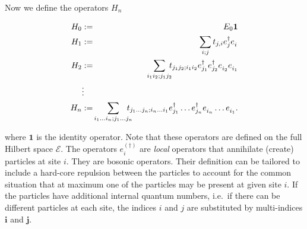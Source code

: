 Now we define the operators $H_n$
\begin{mathletters}
\label{class}
\begin{eqnarray}
  H_0&:=& E_0{\mathbf 1}\\
  H_1&:=& \sum_{i;j}t_{j,i}e_{j}^{\dagger}e_{i}^
  {\phantom{\dagger}}\\
  H_2&:=& \sum_{i_1i_2;j_1j_2}\!\!\!t_{j_1j_2;i_1i_2}
  e_{j_1}^{\dagger}e_{j_2}^{\dagger}e_{i_2}^{\phantom\dagger}
  e_{i_1}^{\phantom\dagger}\\
  &\vdots & \nonumber \\
  H_n&:=& \hspace{-3mm} \sum_{i_1\ldots i_n; j_1\ldots j_n}\hspace{-3mm}
t_{j_1\ldots j_n;i_n\ldots i_1} 
e^{\dagger}_{j_1}\ldots e^{\dagger}_{j_n}
  e^{\phantom\dagger}_{i_n}\ldots e^{\phantom\dagger}_{i_1} .
\end{eqnarray}
\end{mathletters}
where ${\mathbf 1}$ is the identity operator. Note that these operators are 
defined on the full Hilbert space ${\mathcal E}$. 
The operators $e_i^{(\dagger)}$ are {\it local} operators that annihilate 
(create) particles at site $i$. They are  bosonic operators. Their definition 
can be tailored to include a hard-core repulsion between the particles to 
account for the common situation that at maximum one of the particles
may be present at given site $i$. If the particles have additional internal
quantum numbers, i.e.\ if there can be different particles at each site,
the indices $i$ and $j$ are substituted by multi-indices ${\mathbf i}$
and ${\mathbf j}$. 

